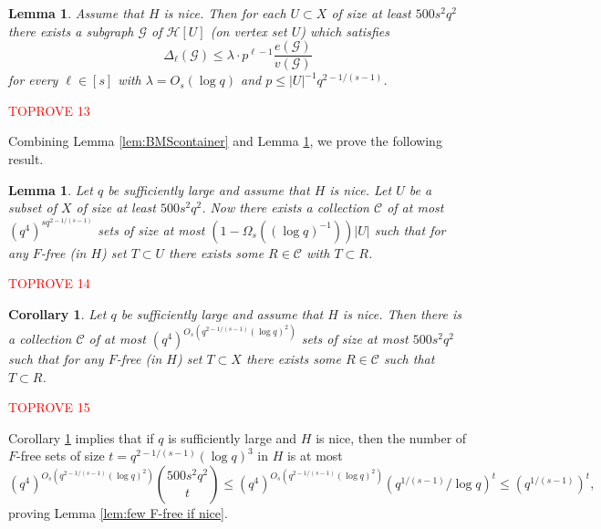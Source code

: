 \documentclass[11pt]{article}
\let\oldendproof\endproof
\renewenvironment{proof}[1][\proofname]{\oldproof[\bf #1]}{\oldendproof}
\theoremstyle{plain}
\newtheorem{lemma}[theorem]{Lemma}
\newtheorem{corollary}[theorem]{Corollary}
\theoremstyle{definition}
\begin{document}
\begin{lemma} \label{lem:bounded degree}
    Assume that $H$ is nice. Then for each $U\subset X$ of size at least $500s^2q^2$ there exists a subgraph $\mathcal{G}$ of $\mathcal{H}[U]$ (on vertex set $U$) which satisfies
    \begin{equation}
        \Delta_{\ell}(\mathcal{G})\leq \lambda\cdot p^{\ell-1}\frac{e(\mathcal{G})}{v(\mathcal{G})} \label{eqn:bounded codegrees}
    \end{equation}
    for every $\ell\in [s]$ with $\lambda=O_s(\log q)$ and $p\leq |U|^{-1}q^{2-1/(s-1)}$.
\end{lemma}

\begin{proof}\textcolor{red}{TOPROVE 13}\end{proof}

Combining Lemma \ref{lem:BMScontainer} and Lemma \ref{lem:bounded degree}, we prove the following result.

\begin{lemma} \label{lem:container}
    Let $q$ be sufficiently large and assume that $H$ is nice. Let $U$ be a subset of $X$ of size at least $500s^2q^2$. Now there exists a collection $\mathcal{C}$ of at most $(q^4)^{sq^{2-1/(s-1)}}$ sets of size at most $(1-\Omega_s((\log q)^{-1}))|U|$ such that for any $F$-free (in $H$) set $T\subset U$ there exists some $R\in \mathcal{C}$ with $T\subset R$.
\end{lemma}

\begin{proof}\textcolor{red}{TOPROVE 14}\end{proof}

\begin{corollary} \label{cor:few sets}
    Let $q$ be sufficiently large and assume that $H$ is nice. Then there is a collection $\mathcal{C}$ of at most $(q^4)^{O_s(q^{2-1/(s-1)}(\log q)^2)}$ sets of size at most $500s^2q^2$ such that for any $F$-free (in $H$) set $T\subset X$ there exists some $R\in \mathcal{C}$ such that $T\subset R$.
\end{corollary}

\begin{proof}\textcolor{red}{TOPROVE 15}\end{proof}

Corollary \ref{cor:few sets} implies that if $q$ is sufficiently large and $H$ is nice, then the number of $F$-free sets of size $t=q^{2-1/(s-1)}(\log q)^{3}$ in $H$ is at most $$(q^4)^{O_s(q^{2-1/(s-1)}(\log q)^{2})}\binom{500s^2q^2}{t}\leq (q^4)^{O_s(q^{2-1/(s-1)}(\log q)^{2})}(q^{1/(s-1)}/\log q)^t\leq (q^{1/(s-1)})^t,$$
proving Lemma \ref{lem:few F-free if nice}.
\end{document}
